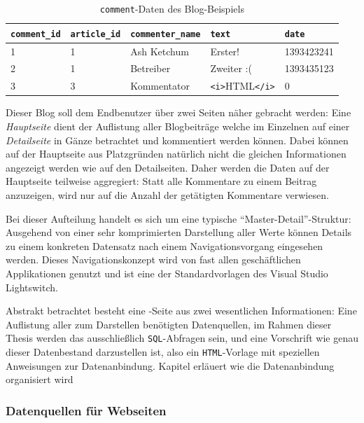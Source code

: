 \begin{table}[h]
  \centering
  \begin{tabularx}{\linewidth}{ l l l X l }
    \texttt{comment\_id}&\texttt{article\_id}&\texttt{commenter\_name}&\texttt{text}&\texttt{date}\\
    \hline
    1&1&Ash Ketchum&Erster!&1393423241\\
    2&1&Betreiber&Zweiter :(&1393435123\\
    3&3&Kommentator&\texttt{<i>}HTML\texttt{</i>}&0\\
  \end{tabularx}
  \caption{\texttt{comment}-Daten des Blog-Beispiels}
  \label{tab:ui-concept-data-comment}
\end{table}

Dieser Blog soll dem Endbenutzer über zwei Seiten näher gebracht werden: Eine \textit{Hauptseite} dient der Auflistung aller Blogbeiträge welche im Einzelnen auf einer \textit{Detailseite} in Gänze betrachtet und kommentiert werden können. Dabei können auf der Hauptseite aus Platzgründen natürlich nicht die gleichen Informationen angezeigt werden wie auf den Detailseiten. Daher werden die Daten auf der Hauptseite teilweise aggregiert: Statt alle Kommentare zu einem Beitrag anzuzeigen, wird nur auf die Anzahl der getätigten Kommentare verwiesen.

Bei dieser Aufteilung handelt es sich um eine typische "`Master-Detail"'-Struktur: Ausgehend von einer sehr komprimierten Darstellung aller Werte können Details zu einem konkreten Datensatz nach einem Navigationsvorgang eingesehen werden. Dieses Navigationskonzept wird von fast allen geschäftlichen Applikationen genutzt und ist eine der Standardvorlagen des Visual Studio Lightswitch.

Abstrakt betrachtet besteht eine \idename{}-Seite aus zwei wesentlichen Informationen: Eine Auflistung aller zum Darstellen benötigten Datenquellen, im Rahmen dieser Thesis werden das ausschließlich \texttt{SQL}-Abfragen sein, und eine Vorschrift wie genau dieser Datenbestand darzustellen ist, also ein \texttt{HTML}-Vorlage mit speziellen Anweisungen zur Datenanbindung. Kapitel  erläuert wie die Datenanbindung organisiert wird

\subsubsection{Datenquellen für Webseiten}
\label{sec:page-data-sources}

